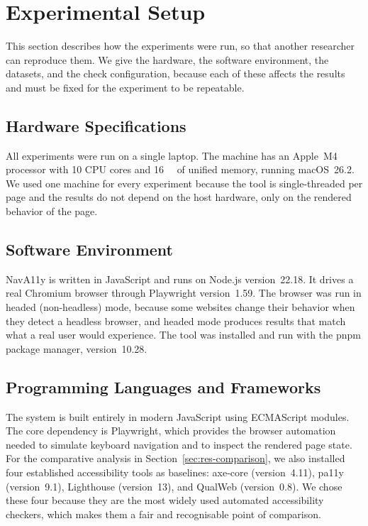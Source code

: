 \section{Experimental Setup}
\label{sec:res-setup}

This section describes how the experiments were run, so that another researcher can
reproduce them. We give the hardware, the software environment, the datasets, and the
check configuration, because each of these affects the results and must be fixed for the
experiment to be repeatable.

\subsection{Hardware Specifications}
All experiments were run on a single laptop. The machine has an Apple~M4 processor with 10
CPU cores and \SI{16}{\giga\byte} of unified memory, running macOS~26.2. We used one
machine for every experiment because the tool is single-threaded per page and the results
do not depend on the host hardware, only on the rendered behavior of the page.

\subsection{Software Environment}
NavA11y is written in JavaScript and runs on Node.js version~22.18. It drives a real
Chromium browser through Playwright version~1.59. The browser was run in headed
(non-headless) mode, because some websites change their behavior when they detect a
headless browser, and headed mode produces results that match what a real user would
experience. The tool was installed and run with the pnpm package manager, version~10.28.

\subsection{Programming Languages and Frameworks}
The system is built entirely in modern JavaScript using ECMAScript modules. The core
dependency is Playwright, which provides the browser automation needed to simulate keyboard
navigation and to inspect the rendered page state. For the comparative analysis in
Section~\ref{sec:res-comparison}, we also installed four established accessibility tools as
baselines: axe-core (version~4.11), pa11y (version~9.1), Lighthouse (version~13), and
QualWeb (version~0.8). We chose these four because they are the most widely used automated
accessibility checkers, which makes them a fair and recognisable point of comparison.

